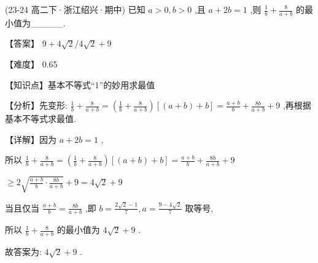 \documentclass[11pt,a4paper]{article}
\begin{document}
\begin{hmwk} 
 (23-24 高二下·浙江绍兴·期中) 已知 \(\displaystyle a > 0,b > 0\) ,且 \(\displaystyle a + {2b} = 1\) ,则 \(\displaystyle \frac{1}{b} + \frac{8}{a + b}\) 的最小值为\_\_\_\_\_.

\begin{jiexi}
【答案】 \(\displaystyle 9 + 4\sqrt{2}/4\sqrt{2} + 9\)

【难度】 0.65

【知识点】基本不等式“1”的妙用求最值

【分析】先变形: \(\displaystyle \frac{1}{b} + \frac{8}{a + b} = \left( {\frac{1}{b} + \frac{8}{a + b}}\right) \left\lbrack  {\left( {a + b}\right)  + b}\right\rbrack   = \frac{a + b}{b} + \frac{8b}{a + b} + 9\) ,再根据基本不等式求最值.

【详解】因为 \(\displaystyle a + {2b} = 1\) ,

所以 \(\displaystyle \frac{1}{b} + \frac{8}{a + b} = \left( {\frac{1}{b} + \frac{8}{a + b}}\right) \left\lbrack  {\left( {a + b}\right)  + b}\right\rbrack   = \frac{a + b}{b} + \frac{8b}{a + b} + 9\)

\(\displaystyle \geq  2\sqrt{\frac{a + b}{b} \cdot  \frac{8b}{a + b}} + 9 = 4\sqrt{2} + 9\)

当且仅当 \(\displaystyle \frac{a + b}{b} = \frac{8b}{a + b}\) ,即 \(\displaystyle b = \frac{2\sqrt{2} - 1}{7},a = \frac{9 - 4\sqrt{2}}{7}\) 取等号,

所以 \(\displaystyle \frac{1}{b} + \frac{8}{a + b}\) 的最小值为 \(\displaystyle 4\sqrt{2} + 9\) .

故答案为: \(\displaystyle 4\sqrt{2} + 9\) .

\end{jiexi}
\end{hmwk}
\end{document}

